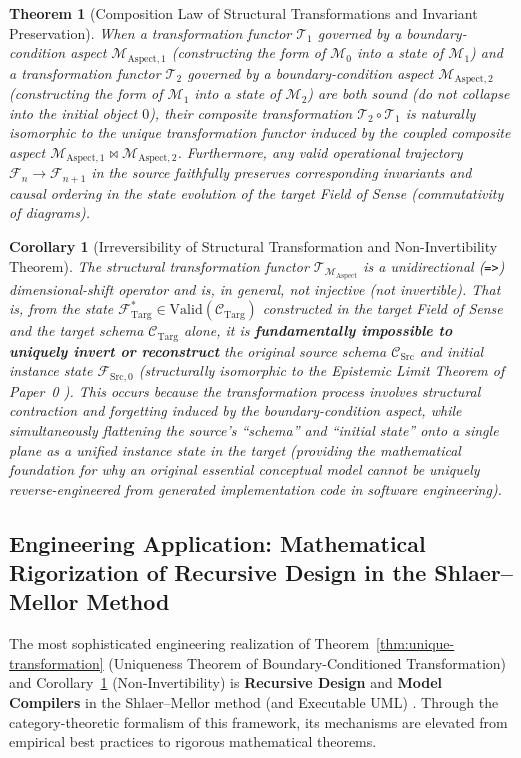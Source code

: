 \documentclass[11pt,a4paper]{article}
\theoremstyle{definition}
\theoremstyle{plain}
\newtheorem{theorem}{Theorem}[section]
\newtheorem{corollary}{Corollary}[section]
\theoremstyle{remark}
\newcommand{\Valid}{\mathrm{Valid}}
\newcommand{\CSrc}{\mathcal{C}_{\mathrm{Src}}}
\newcommand{\CTarg}{\mathcal{C}_{\mathrm{Targ}}}
\newcommand{\MAspect}{\mathcal{M}_{\mathrm{Aspect}}}
\begin{document}
\begin{theorem}[Composition Law of Structural Transformations and Invariant Preservation]\label{thm:transformation-composition}
When a transformation functor $\mathcal{T}_1$ governed by a boundary-condition aspect $\mathcal{M}_{\mathrm{Aspect}, 1}$ (constructing the form of $\mathcal{M}_0$ into a state of $\mathcal{M}_1$) and a transformation functor $\mathcal{T}_2$ governed by a boundary-condition aspect $\mathcal{M}_{\mathrm{Aspect}, 2}$ (constructing the form of $\mathcal{M}_1$ into a state of $\mathcal{M}_2$) are both sound (do not collapse into the initial object $0$), their composite transformation $\mathcal{T}_2 \circ \mathcal{T}_1$ is naturally isomorphic to the unique transformation functor induced by the coupled composite aspect $\mathcal{M}_{\mathrm{Aspect}, 1} \bowtie \mathcal{M}_{\mathrm{Aspect}, 2}$. Furthermore, any valid operational trajectory $\mathcal{F}_n \to \mathcal{F}_{n+1}$ in the source faithfully preserves corresponding invariants and causal ordering in the state evolution of the target Field of Sense (commutativity of diagrams).
\end{theorem}

\begin{corollary}[Irreversibility of Structural Transformation and Non-Invertibility Theorem]\label{cor:irreversibility}
The structural transformation functor $\mathcal{T}_{\MAspect}$ is a unidirectional (\texttt{=>}) dimensional-shift operator and is, in general, not injective (not invertible). That is, from the state $\mathcal{F}_{\mathrm{Targ}}^* \in \Valid(\CTarg)$ constructed in the target Field of Sense and the target schema $\CTarg$ alone, it is \textbf{fundamentally impossible to uniquely invert or reconstruct} the original source schema $\CSrc$ and initial instance state $\mathcal{F}_{\mathrm{Src}, 0}$ (structurally isomorphic to the Epistemic Limit Theorem of Paper~0 \cite{ota2026paper0}). This occurs because the transformation process involves structural contraction and forgetting induced by the boundary-condition aspect, while simultaneously flattening the source's ``schema'' and ``initial state'' onto a single plane as a unified instance state in the target (providing the mathematical foundation for why an original essential conceptual model cannot be uniquely reverse-engineered from generated implementation code in software engineering).
\end{corollary}

\subsection{Engineering Application: Mathematical Rigorization of Recursive Design in the Shlaer--Mellor Method}
The most sophisticated engineering realization of Theorem~\ref{thm:unique-transformation} (Uniqueness Theorem of Boundary-Conditioned Transformation) and Corollary~\ref{cor:irreversibility} (Non-Invertibility) is \textbf{Recursive Design} and \textbf{Model Compilers} in the Shlaer--Mellor method (and Executable UML) \cite{shlaer1992,mellor2002}. Through the category-theoretic formalism of this framework, its mechanisms are elevated from empirical best practices to rigorous mathematical theorems.
\end{document}

